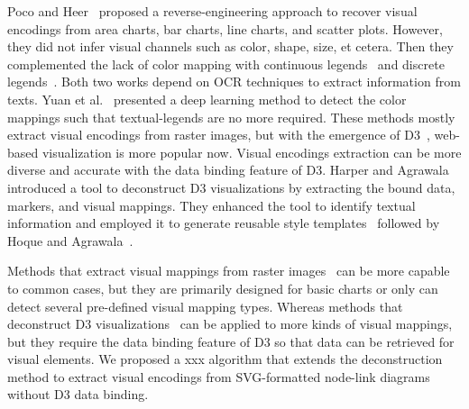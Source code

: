 Poco and Heer~\cite{DBLP:journals/cgf/PocoH17} proposed a reverse-engineering approach to recover visual encodings from area charts, bar charts, line charts, and scatter plots. However, they%
did not infer visual channels such as color, shape, size, et cetera.
Then they complemented the lack of color mapping with continuous legends~\cite{DBLP:journals/tvcg/PocoMH18} and discrete legends~\cite{DBLP:conf/sibgrapi/MayhuaNHP18}.
Both two works depend on OCR techniques to extract information from texts.
Yuan et al.~\cite{DBLP:journals/corr/abs-2103-00741} presented a deep learning method to detect the color mappings such that textual-legends are no more required.
These methods mostly extract visual encodings from raster images, but with the emergence of D3~\cite{DBLP:journals/tvcg/BostockOH11}, web-based visualization is more popular now.
Visual encodings extraction can be more diverse and accurate with the data binding feature of D3.
Harper and Agrawala~\cite{DBLP:conf/uist/HarperA14} introduced a tool to deconstruct D3 visualizations by extracting the bound data, markers, and visual mappings. 
They enhanced the tool to identify textual information and employed it to generate reusable style templates~\cite{DBLP:journals/tvcg/HarperA18} followed by Hoque and Agrawala~\cite{DBLP:journals/tvcg/HoqueA20}. %

Methods that extract visual mappings from raster images~\cite{DBLP:journals/cgf/PocoH17, DBLP:journals/tvcg/PocoMH18, DBLP:conf/sibgrapi/MayhuaNHP18, DBLP:journals/corr/abs-2103-00741} can be more capable to common cases, but they are primarily designed for basic charts or only can detect several pre-defined visual mapping types.
Whereas methods that deconstruct D3 visualizations~\cite{DBLP:conf/uist/HarperA14, DBLP:journals/tvcg/HarperA18, DBLP:journals/tvcg/HoqueA20} can be applied to more kinds of visual mappings, but they require the data binding feature of D3 so that data can be retrieved for visual elements. We proposed a {\color{red} xxx } algorithm that extends the deconstruction method to extract visual encodings from SVG-formatted node-link diagrams without D3 data binding.

